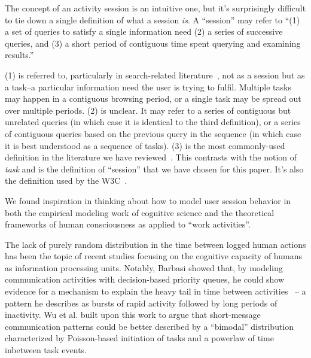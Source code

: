 The concept of an activity session is an intuitive one, but it's surprisingly difficult to tie down a single definition of what a session \emph{is}.  A ``session'' may refer to ``(1) a set of queries to satisfy a single information need (2) a series of successive queries, and (3) a short period of contiguous time spent querying and examining results.''~\cite{jones2008beyond}

(1) is referred to, particularly in search-related literature~\cite{eickhoff2014lessons,jones2008beyond}, not as a session but as a task--a particular information need the user is trying to fulfil.  Multiple tasks may happen in a contiguous browsing period, or a single task may be spread out over multiple periods.
(2) is unclear. It may refer to a series of contiguous but unrelated queries (in which case it is identical to the third definition), or a series of contiguous queries based on the previous query in the sequence (in which case it is best understood as a sequence of tasks).
(3) is the most commonly-used definition in the literature we have reviewed~\cite{govseva2006empirical,nadjarbashi2004improving,spiliopoulou2003framework,white2010assessing}. This contrasts with the notion of \emph{task} and is the definition of ``session'' that we have chosen for this paper. It's also the definition used by the W3C~\cite{W3C1999}.

We found inspiration in thinking about how to model user session behavior in both the empirical modeling work of cognitive science and the theoretical frameworks of human consciousness as applied to ``work activities''.
 
The lack of purely random distribution in the time between logged human actions has been the topic of recent studies focusing on the cognitive capacity of humans as information processing units.  Notably, Barbasi showed that, by modeling communication activities with decision-based priority queues, he could show evidence for a mechanism to explain the heavy tail in time between activities~\cite{barabasi2005origin} -- a pattern he describes as bursts of rapid activity followed by long periods of inactivity.  Wu et al. built upon this work to argue that short-message communication patterns could be better described by a ``bimodal'' distribution characterized by Poisson-based initiation of tasks and a powerlaw of time inbetween task events\cite{wu2010evidence}.


